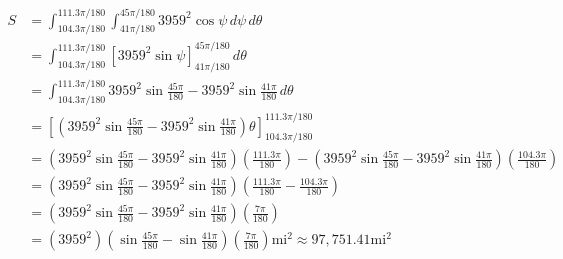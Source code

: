 \documentclass{article}
\newcommand{\lrp}[1]{\left( #1 \right)}
\newcommand{\lrb}[1]{\left[ #1 \right]}
\begin{document}
\begin{align*}
    S&=\int_{104.3\pi/180}^{111.3\pi/180}\int_{41\pi/180}^{45\pi/180}3959^2\cos\psi\,d\psi\,d\theta\\
    &=\int_{104.3\pi/180}^{111.3\pi/180}\lrb{3959^2\sin\psi}_{41\pi/180}^{45\pi/180}\,d\theta\\
    &=\int_{104.3\pi/180}^{111.3\pi/180}3959^2\sin\frac{45\pi}{180}-3959^2\sin\frac{41\pi}{180}\,d\theta\\
    &=\lrb{\lrp{3959^2\sin\frac{45\pi}{180}-3959^2\sin\frac{41\pi}{180}}\theta}_{104.3\pi/180}^{111.3\pi/180}\\
    &=\lrp{3959^2\sin\frac{45\pi}{180}-3959^2\sin\frac{41\pi}{180}}\lrp{\frac{111.3\pi}{180}}-\lrp{3959^2\sin\frac{45\pi}{180}-3959^2\sin\frac{41\pi}{180}}\lrp{\frac{104.3\pi}{180}}\\
    &=\lrp{3959^2\sin\frac{45\pi}{180}-3959^2\sin\frac{41\pi}{180}}\lrp{\frac{111.3\pi}{180}-\frac{104.3\pi}{180}}\\
    &=\lrp{3959^2\sin\frac{45\pi}{180}-3959^2\sin\frac{41\pi}{180}}\lrp{\frac{7\pi}{180}}\\
    &=\boxed{\lrp{3959^2}\lrp{\sin\frac{45\pi}{180}-\sin\frac{41\pi}{180}}\lrp{\frac{7\pi}{180}}\text{mi}^2\approx97,751.41\text{mi}^2}\tag{use a calculator}
\end{align*}
\end{document}

